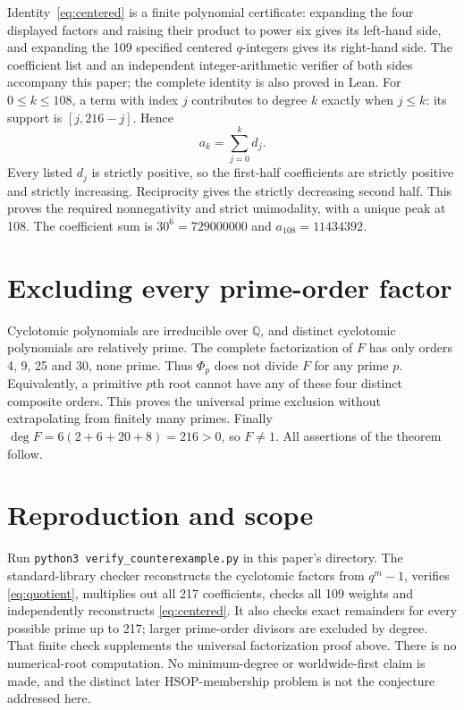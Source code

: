 \documentclass[11pt]{article}
\begin{document}
Identity~\eqref{eq:centered} is a finite polynomial certificate: expanding
the four displayed factors and raising their product to power six gives
its left-hand side, and expanding the 109 specified centered $q$-integers
gives its right-hand side. The coefficient list and an independent
integer-arithmetic verifier of both sides accompany this paper; the
complete identity is also proved in Lean.
For $0\le k\le108$, a term with index $j$ contributes to degree $k$
exactly when $j\le k$: its support is $[j,216-j]$. Hence
\[
 a_k=\sum_{j=0}^k d_j.
\]
Every listed $d_j$ is strictly positive, so the first-half coefficients
are strictly positive and strictly increasing. Reciprocity gives the
strictly decreasing second half. This proves the required nonnegativity
and strict unimodality, with a unique peak at 108. The coefficient sum
is $30^6=729000000$ and $a_{108}=11434392$.

\section{Excluding every prime-order factor}
Cyclotomic polynomials are irreducible over $\mathbb Q$, and distinct
cyclotomic polynomials are relatively prime. The complete factorization
of $F$ has only orders 4, 9, 25 and 30, none prime. Thus $\Phi_p$ does not
divide $F$ for any prime $p$. Equivalently, a primitive $p$th root cannot
have any of these four distinct composite orders. This proves the
universal prime exclusion without extrapolating from finitely many primes.
Finally $\deg F=6(2+6+20+8)=216>0$, so $F\ne1$. All assertions of the
theorem follow.

\section{Reproduction and scope}
Run \texttt{python3 verify\_counterexample.py} in this paper's directory.
The standard-library checker reconstructs the cyclotomic factors from
$q^m-1$, verifies \eqref{eq:quotient}, multiplies out all 217 coefficients,
checks all 109 weights and independently reconstructs \eqref{eq:centered}.
It also checks exact remainders for every possible prime up to 217; larger
prime-order divisors are excluded by degree. That finite check supplements
the universal factorization proof above. There is no numerical-root
computation. No minimum-degree or worldwide-first claim is made, and the
distinct later HSOP-membership problem is not the conjecture addressed here.
\end{document}
